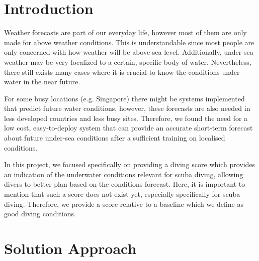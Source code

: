 \documentclass{article}
\begin{document}
\section{Introduction}
\begin{multicols}{2}
Weather forecasts are part of our everyday life, however most of them are only made for above weather conditions. This is understandable since most people are only concerned with how weather will be above sea level. Additionally, under-sea weather may be very localized to a certain, specific body of water. Nevertheless, there still exists many cases where it is crucial to know the conditions under water in the near future.

For some busy locations (e.g. Singapore) there might be systems implemented that predict future water conditions, however, these forecasts are also needed in less developed countries and less busy sites. Therefore, we found the need for a low cost, easy-to-deploy system that can provide an accurate short-term forecast about future under-sea conditions after a sufficient training on localised conditions.

In this project, we focused specifically on providing a diving score which provides an indication of the underwater conditions relevant for scuba diving, allowing divers to better plan based on the conditions forecast. Here, it is important to mention that such a score does not exist yet, especially specifically for scuba diving. Therefore, we provide a score relative to a baseline which we define as good diving conditions.

\end{multicols}

\section{Solution Approach}
\end{document}
